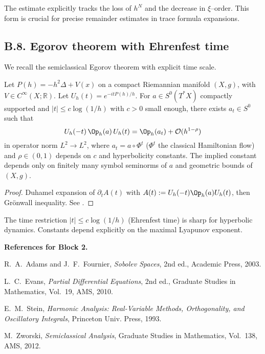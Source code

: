 \begin{remark}
The estimate explicitly tracks the loss of $h^N$ and the decrease in $\xi$–order. This form is crucial for precise remainder estimates in trace formula expansions.
\end{remark}

\subsection*{B.8. Egorov theorem with Ehrenfest time}
\label{appB:egorov}

We recall the semiclassical Egorov theorem with explicit time scale.

\begin{theorem}
\label{thm:egorov}
Let $P(h)=-h^2\Delta + V(x)$ on a compact Riemannian manifold $(X,g)$, with $V\in C^\infty(X;\mathbb{R})$. Let $U_h(t)=e^{-itP(h)/h}$. For $a\in S^0(T^*X)$ compactly supported and $|t|\le c\log(1/h)$ with $c>0$ small enough, there exists $a_t\in S^0$ such that
\[
U_h(-t)\, \Op_h(a)\, U_h(t) = \Op_h(a_t) + \mathcal{O}(h^{1-\rho})
\]
in operator norm $L^2\to L^2$, where $a_t=a\circ \Phi^t$ ($\Phi^t$ the classical Hamiltonian flow) and $\rho\in(0,1)$ depends on $c$ and hyperbolicity constants. The implied constant depends only on finitely many symbol seminorms of $a$ and geometric bounds of $(X,g)$.
\end{theorem}

\begin{proof}
Duhamel expansion of $\partial_t A(t)$ with $A(t):=U_h(-t)\Op_h(a)U_h(t)$, then Grönwall inequality. See \cite[Thm.~11.9]{Zworski}.
\end{proof}

\begin{remark}
The time restriction $|t|\le c\log(1/h)$ (Ehrenfest time) is sharp for hyperbolic dynamics. Constants depend explicitly on the maximal Lyapunov exponent.
\end{remark}

\medskip

\noindent\textbf{References for Block 2.}
\begin{thebibliography}{99}

R.~A.~Adams and J.~F.~Fournier, \emph{Sobolev Spaces}, 2nd ed., Academic Press, 2003.

L.~C.~Evans, \emph{Partial Differential Equations}, 2nd ed., Graduate Studies in Mathematics, Vol.~19, AMS, 2010.

E.~M.~Stein, \emph{Harmonic Analysis: Real-Variable Methods, Orthogonality, and Oscillatory Integrals}, Princeton Univ. Press, 1993.

M.~Zworski, \emph{Semiclassical Analysis}, Graduate Studies in Mathematics, Vol.~138, AMS, 2012.

\end{thebibliography}


